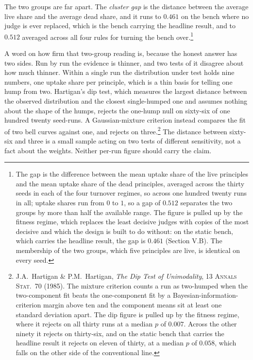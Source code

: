 The two groups are far apart. The \textit{cluster gap} is the distance between
the average live share and the average dead share, and it runs to $0.461$ on
the bench
where no judge is ever replaced, which is the bench carrying the headline
result, and to $0.512$ averaged across all four rules for turning the bench
over.\footnote{The gap is the difference between the mean uptake share of the
live principles and the mean uptake share of the dead principles, averaged
across the thirty seeds in each of the four turnover regimes, so across one
hundred twenty runs in all; uptake shares run from $0$ to $1$, so a gap of
$0.512$ separates the two groups by more than half the available range. The
figure is pulled up by the fitness regime, which replaces the least decisive
judges with copies of the most decisive and which the design is built to do
without: on the static bench, which carries the headline result, the gap is
$0.461$ (Section V.B). The membership
of the two groups, which five principles are live, is identical on every
seed.}

A word on how firm that two-group reading is, because the honest answer has
two sides. Run by run the evidence is thinner, and two tests of it disagree
about how much thinner. Within a single run the distribution under test holds
nine numbers, one uptake share per principle, which is a thin basis for
telling one hump from two. Hartigan's dip test, which measures the largest
distance between the observed distribution and the closest single-humped one and
assumes nothing about the shape of the humps, rejects the one-hump null on
sixty-six of one hundred twenty seed-runs. A Gaussian-mixture criterion instead compares the
fit of two bell curves against one, and rejects on three.\footnote{J.A.\ Hartigan \& P.M.\ Hartigan, \textit{The Dip Test of
Unimodality}, 13 \textsc{Annals Stat.}\ 70 (1985). The mixture criterion
counts a run as two-humped when the two-component fit beats the one-component
fit by a Bayesian-information-criterion margin above ten and the component
means sit at least one standard deviation apart. The dip figure is pulled up
by the fitness regime, where it rejects on all thirty runs at a median $p$ of
$0.007$. Across the other ninety it rejects on thirty-six, and on the static
bench that carries the headline result it rejects on eleven of thirty, at a
median $p$ of $0.058$, which falls on the other side of the conventional
line.} The distance between sixty-six and three is a small sample acting
on two tests of different sensitivity, not a fact about the weights. Neither per-run
figure should carry the claim.

